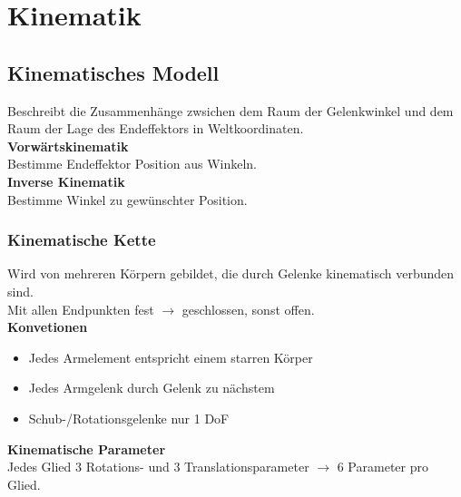 

\section{Kinematik}
\subsection{Kinematisches Modell}
Beschreibt die Zusammenhänge zwsichen dem Raum der Gelenkwinkel und dem Raum der Lage des Endeffektors in
Weltkoordinaten.\\

\textbf{Vorwärtskinematik}\\
Bestimme Endeffektor Position aus Winkeln.\\

\textbf{Inverse Kinematik}\\
Bestimme Winkel zu gewünschter Position.\\

\subsubsection{Kinematische Kette}
Wird von mehreren Körpern gebildet, die durch Gelenke kinematisch verbunden sind.\\
Mit allen Endpunkten fest \(\rightarrow\) geschlossen, sonst offen.\\

\textbf{Konvetionen}
\begin{itemize}
\item Jedes Armelement entspricht einem starren Körper
\item Jedes Armgelenk durch Gelenk zu nächstem
\item Schub-/Rotationsgelenke nur 1 DoF
\end{itemize}

\textbf{Kinematische Parameter}\\
Jedes Glied 3 Rotations- und 3 Translationsparameter \(\rightarrow\) 6 Parameter pro Glied.

